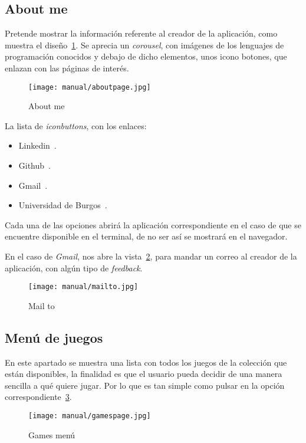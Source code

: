 \subsection{About me}\label{about}
Pretende mostrar la información referente al creador de la aplicación, como muestra el diseño~\ref{fig:aboutpage}. Se aprecia un \emph{corousel}, con imágenes de los lenguajes de programación conocidos y debajo de dicho elementos, unos icono botones, que enlazan con las páginas de interés.

\begin{figure}[H]
	\centering
	\texttt{[image: manual/aboutpage.jpg]}
	\caption{About me}\label{fig:aboutpage}
\end{figure}

La lista de \emph{iconbuttons}, con los enlaces:
\begin{itemize}
	\item Linkedin~\cite{linkedin:cuenta}.
	\item Github~\cite{github:repo}.
	\item Gmail~\cite{mailto:mailto}.
	\item Universidad de Burgos~\cite{ubu:page}.
\end{itemize}

Cada una de las opciones abrirá la aplicación correspondiente en el caso de que se encuentre disponible en el terminal, de no ser así se mostrará en el navegador.

En el caso de \emph{Gmail}, nos abre la vista~\ref{fig:mailto}, para mandar un correo al creador de la aplicación, con algún tipo de \emph{feedback}.

\begin{figure}[H]
	\centering
	\texttt{[image: manual/mailto.jpg]}
	\caption{Mail to}\label{fig:mailto}
\end{figure}

\subsection{Menú de juegos}\label{menugames}
En este apartado se muestra una lista con todos los juegos de la colección que están disponibles, la finalidad es que el usuario pueda decidir de una manera sencilla a qué quiere jugar. Por lo que es tan simple como pulsar en la opción correspondiente~\ref{fig:gamespage}.

\begin{figure}[H]
	\centering
	\texttt{[image: manual/gamespage.jpg]}
	\caption{Games menú}\label{fig:gamespage}
\end{figure}

